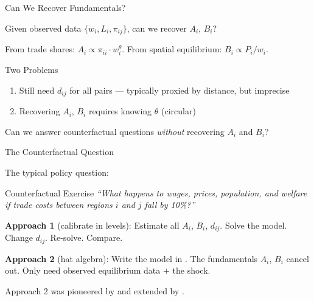 \documentclass{beamer}
\begin{document}
\begin{frame}{Can We Recover Fundamentals?}

     Given observed data $\{w_i, L_i, \pi_{ij}\}$, can we recover $A_i$, $B_i$?

    \vspace{0.3em}
    From trade shares: $A_i \propto \pi_{ii} \cdot w_i^{\theta}$. \quad From spatial equilibrium: $B_i \propto P_i / w_i$.

    \vspace{0.3em}
    \begin{alertblock}{Two Problems}
        \begin{enumerate}
            \item Still need $d_{ij}$ for all pairs --- typically proxied by distance, but imprecise
            \item Recovering $A_i$, $B_i$ requires knowing $\theta$ (circular)
        \end{enumerate}
    \end{alertblock}

    \vspace{0.3em}
     Can we answer counterfactual questions \emph{without} recovering $A_i$ and $B_i$?

    \vspace{0.2em}

\end{frame}

\begin{frame}{The Counterfactual Question}

    The typical policy question:

    \vspace{0.5em}
    \begin{block}{Counterfactual Exercise}
        \emph{``What happens to wages, prices, population, and welfare if trade costs between regions $i$ and $j$ fall by 10\%?''}
    \end{block}

    \vspace{0.5em}
    \textbf{Approach 1} (calibrate in levels): Estimate all $A_i$, $B_i$, $d_{ij}$. Solve the model. Change $d_{ij}$. Re-solve. Compare.

    \vspace{0.3em}
    \textbf{Approach 2} (hat algebra): Write the model in . The fundamentals $A_i$, $B_i$ cancel out. Only need observed equilibrium data $+$ the shock.

    \vspace{0.5em}
    Approach 2 was pioneered by \cite{EatonKortum2002_technology} and extended by \cite{CaliendoParro2015_trade}.

\end{frame}
\end{document}
